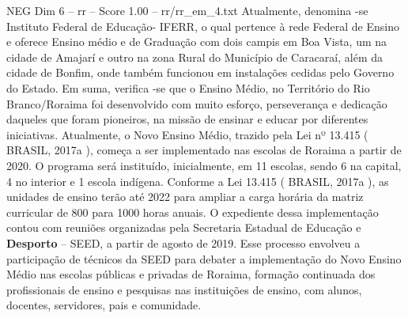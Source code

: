 \begin{textsample}{NEG Dim 6 – rr – Score 1.00 – rr/rr\_em\_4.txt}
Atualmente, denomina -se Instituto Federal de Educação- IFERR, o qual pertence à rede Federal de Ensino e oferece Ensino médio e de Graduação com dois campis em Boa Vista, um na cidade de Amajarí e outro na zona Rural do Município de Caracaraí, além da cidade de Bonfim, onde também funcionou em instalações cedidas pelo Governo do Estado.
Em suma, verifica -se que o Ensino Médio, no Território do Rio Branco/Roraima foi desenvolvido com muito esforço, perseverança e dedicação daqueles que foram pioneiros, na missão de ensinar e educar por diferentes iniciativas.
Atualmente, o Novo Ensino Médio, trazido pela Lei nº 13.415 ( BRASIL, 2017a ), começa a ser implementado nas escolas de Roraima a partir de 2020.
O programa será instituído, inicialmente, em 11 escolas, sendo 6 na capital, 4 no interior e 1 escola indígena.
Conforme a Lei 13.415 ( BRASIL, 2017a ), as unidades de ensino terão até 2022 para ampliar a carga horária da matriz curricular de 800 para 1000 horas anuais.
O expediente dessa implementação contou com reuniões organizadas pela Secretaria Estadual de Educação e \textbf{Desporto} – SEED, a partir de agosto de 2019.
Esse processo envolveu a participação de técnicos da SEED para debater a implementação do Novo Ensino Médio nas escolas públicas e privadas de Roraima, formação continuada dos profissionais de ensino e pesquisas nas instituições de ensino, com alunos, docentes, servidores, pais e comunidade.

\end{textsample}
